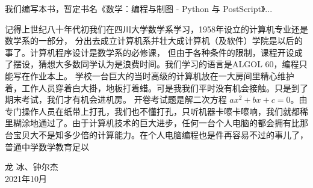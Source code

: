 \documentclass[main.tex]{subfiles}
\begin{document}
我们编写本书，暂定书名《数学：编程与制图 - Python 与 PostScript》...

记得上世纪八十年代初我们在四川大学数学系学习，1958年设立的计算机专业还是数学系的一部分，
分出去成立计算机系并壮大成计算机（及软件）学院是以后的事了。计算机程序设计是数学系的必修课，
但由于各种条件的限制，课程开设成了摆设，猜想大多数同学认为是浪费时间。我们学习的语言是ALGOL 60，编程只能写在作业本上。
学校一台巨大的当时高级的计算机放在一大房间里精心维护着，工作人员穿着白大掛，地板打着蜡。可是我我们平时没有机会接触。只是到了期末考试，我们才有机会进机房。
开卷考试题是解二次方程 $ax^2+bx+c = 0$。由专门操作人员在纸带上打孔，我们也不懂打孔，只听机器卡嚓卡嚓响，我们就都稀里糊涂地通过了。由于计算机技术的巨大进步，任何一台个人电脑的都会拥有比那台宝贝大不是知多少倍的计算能力。在个人电脑编程也是件再容易不过的事儿了，普通中学数学教育足以

\begin{flushright}
{\kaishu  龙 冰、钟尔杰}\\
2021年10月
\end{flushright}
\end{document}
